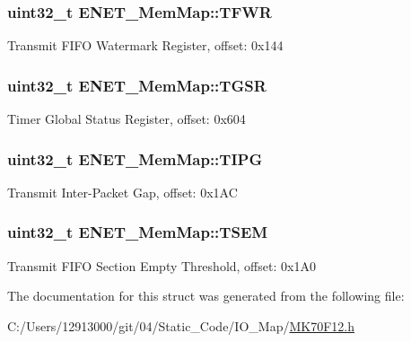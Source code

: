 \subsubsection[{T\+F\+W\+R}]{\setlength{\rightskip}{0pt plus 5cm}uint32\+\_\+t E\+N\+E\+T\+\_\+\+Mem\+Map\+::\+T\+F\+W\+R}\label{struct_e_n_e_t___mem_map_aef8b194a94a2a24c0f705e65af5bee24}
Transmit F\+I\+F\+O Watermark Register, offset\+: 0x144 \hypertarget{struct_e_n_e_t___mem_map_af759f85ad62d7a7d8937391b0eb9f4d4}{}
\subsubsection[{T\+G\+S\+R}]{\setlength{\rightskip}{0pt plus 5cm}uint32\+\_\+t E\+N\+E\+T\+\_\+\+Mem\+Map\+::\+T\+G\+S\+R}\label{struct_e_n_e_t___mem_map_af759f85ad62d7a7d8937391b0eb9f4d4}
Timer Global Status Register, offset\+: 0x604 \hypertarget{struct_e_n_e_t___mem_map_a33c2b64aa493e8e381cd207ac9c6e8ec}{}
\subsubsection[{T\+I\+P\+G}]{\setlength{\rightskip}{0pt plus 5cm}uint32\+\_\+t E\+N\+E\+T\+\_\+\+Mem\+Map\+::\+T\+I\+P\+G}\label{struct_e_n_e_t___mem_map_a33c2b64aa493e8e381cd207ac9c6e8ec}
Transmit Inter-\/\+Packet Gap, offset\+: 0x1\+A\+C \hypertarget{struct_e_n_e_t___mem_map_a8cb50de4da08a100de4f82ddc5f4eb9e}{}
\subsubsection[{T\+S\+E\+M}]{\setlength{\rightskip}{0pt plus 5cm}uint32\+\_\+t E\+N\+E\+T\+\_\+\+Mem\+Map\+::\+T\+S\+E\+M}\label{struct_e_n_e_t___mem_map_a8cb50de4da08a100de4f82ddc5f4eb9e}
Transmit F\+I\+F\+O Section Empty Threshold, offset\+: 0x1\+A0 

The documentation for this struct was generated from the following file\+:\begin{DoxyCompactItemize}
\item 
C\+:/\+Users/12913000/git/04/\+Static\+\_\+\+Code/\+I\+O\+\_\+\+Map/\hyperlink{_m_k70_f12_8h}{M\+K70\+F12.\+h}\end{DoxyCompactItemize}
